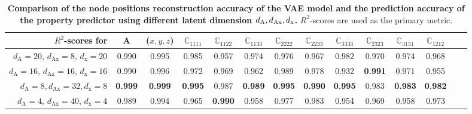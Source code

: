 \documentclass[fleqn,10pt]{wlscirep}
\begin{document}
\begin{table}[htb]
\centering
\begin{tabular}{@{}rccccccccccccc@{}}
\toprule
\footnotesize{$R^2$-scores for}& \footnotesize{$\boldsymbol{A}$}&  \footnotesize{($x,y,z$)   }     & \footnotesize{$\mathbb{C}_{1111}$}   & \footnotesize{$\mathbb{C}_{1122}$}  & \footnotesize{$\mathbb{C}_{1133}$}   & \footnotesize{$\mathbb{C}_{2222}$}   & \footnotesize{$\mathbb{C}_{2233}$}   & \footnotesize{$\mathbb{C}_{3333}$}   & \footnotesize{$\mathbb{C}_{2323}$}   & \footnotesize{$\mathbb{C}_{3131}$}   & \footnotesize{$\mathbb{C}_{1212}$}   \\ \midrule

\scriptsize{$d_{\text{A}} = 20$, $d_{\text{Ax}} = 8$, $d_{\text{x}} = 20$} & \footnotesize{0.990} & \footnotesize{0.995} & \footnotesize{0.985} & \footnotesize{0.957} & \footnotesize{0.974} & \footnotesize{0.976} & \footnotesize{0.967} & \footnotesize{0.982} & \footnotesize{0.970} & \footnotesize{0.974} & \footnotesize{0.968} \\

\scriptsize{$d_{\text{A}} = 16$, $d_{\text{Ax}} = 16$, $d_{\text{x}} = 16$}& \footnotesize{0.990} & \footnotesize{0.996}  & \footnotesize{0.972} & \footnotesize{0.969} & \footnotesize{0.962} & \footnotesize{0.989} & \footnotesize{0.978} & \footnotesize{0.932} & \footnotesize{\textbf{0.991}} & \footnotesize{0.971} & \footnotesize{0.955} \\

\scriptsize{$d_{\text{A}} = 8, d_{\text{Ax}} = 32, d_{\text{x}} = 8$} & \footnotesize{\textbf{0.999}}  & \footnotesize{\textbf{0.999}} & \footnotesize{\textbf{0.995}} & \footnotesize{0.987} & \footnotesize{\textbf{0.989}} & \footnotesize{\textbf{0.995}} &\footnotesize{ \textbf{0.990}} & \footnotesize{\textbf{0.995}} & \footnotesize{0.983 }& \footnotesize{\textbf{0.983}} &\footnotesize{ \textbf{0.982}} \\

\scriptsize{$d_{\text{A}} = 4$, $d_{\text{Ax}} = 40$, $d_{\text{x}} = 4$} & \footnotesize{0.989} & \footnotesize{0.994} & \footnotesize{0.965} & \footnotesize{\textbf{0.990}} & \footnotesize{0.958}& \footnotesize{0.977} & \footnotesize{0.983} & \footnotesize{0.954} & \footnotesize{0.969} & \footnotesize{0.958} & \footnotesize{0.973} \\

 \bottomrule
\end{tabular}
\caption{\textbf{Comparison of the node positions reconstruction accuracy of the VAE model and the prediction accuracy of the property predictor using different latent dimension $d_\text{\normalfont A}, d_\text{\normalfont Ax}, d_\text{\normalfont x}$.} $R^2$-scores are used as the primary metric.} 
\label{tab:overlapping-embedding-model}
\end{table}
\end{document}
